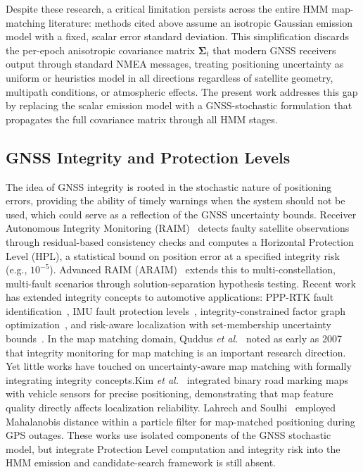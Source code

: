 \documentclass[letterpaper,journal]{IEEEtran}
\begin{document}
Despite these research, a critical limitation persists across the entire
HMM map-matching literature: methods cited above assume an
isotropic Gaussian emission model with a fixed, scalar error standard
deviation. This simplification discards the per-epoch anisotropic covariance
matrix $\boldsymbol{\Sigma}_t$ that modern GNSS receivers output through
standard NMEA messages, treating positioning uncertainty as uniform or heuristics model in all
directions regardless of satellite geometry, multipath conditions, or
atmospheric effects.  The present work addresses this gap by replacing the
scalar emission model with a GNSS-stochastic formulation that propagates
the full covariance matrix through all HMM stages.

\subsection{GNSS Integrity and Protection Levels}

The idea of GNSS integrity is rooted in the stochastic nature of positioning errors, 
providing the ability of timely warnings when the system
should not be used, which could serve as a reflection of the GNSS uncertainty bounds.  
Receiver Autonomous Integrity Monitoring (RAIM)~\cite{Zhang2018} detects faulty
satellite observations through residual-based consistency checks and computes
a Horizontal Protection Level (HPL), a statistical bound on position error
at a specified integrity risk (e.g., $10^{-5}$).  Advanced RAIM
(ARAIM)~\cite{Zhang2019} extends this to multi-constellation, multi-fault
scenarios through solution-separation hypothesis testing.  Recent work has
extended integrity concepts to automotive applications: PPP-RTK fault
identification~\cite{Elsayed2024}, IMU fault protection levels~\cite{Lee2023},
integrity-constrained factor graph optimization~\cite{Xia2023},
and risk-aware localization with set-membership uncertainty bounds~\cite{Neamati2023}.  
In the map matching domain, Quddus 
\emph{et al.}~\cite{Quddus2007} noted as early as 2007 that integrity monitoring 
for map matching is an important research direction. Yet little works have touched 
on uncertainty-aware map matching with formally integrating integrity concepts.Kim \emph{et
al.}~\cite{Kim2019} integrated binary road marking maps with vehicle sensors
for precise positioning, demonstrating that map feature quality directly
affects localization reliability. 
Lahrech and Soulhi~\cite{Lahrech2023} employed Mahalanobis distance within a
particle filter for map-matched positioning during GPS outages. These works
use isolated components of the GNSS stochastic model, but
integrate Protection Level computation and integrity risk into the HMM emission 
and candidate-search framework is still absent.
\end{document}
